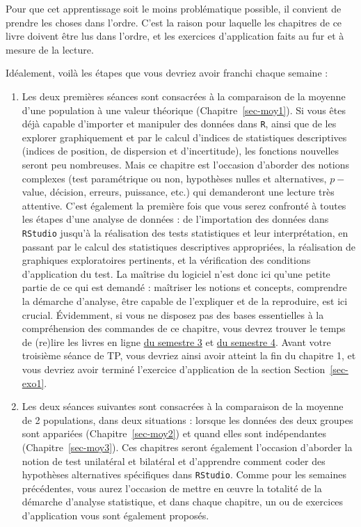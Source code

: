 \documentclass[
  french,
  a4paper,
  DIV=11,
  numbers=noendperiod,
  oneside]{scrreprt}
\begin{document}
Pour que cet apprentissage soit le moins problématique possible, il
convient de prendre les choses dans l'ordre. C'est la raison pour
laquelle les chapitres de ce livre doivent être lus dans l'ordre, et les
exercices d'application faits au fur et à mesure de la lecture.

Idéalement, voilà les étapes que vous devriez avoir franchi chaque
semaine :

\begin{enumerate}
\def\labelenumi{\arabic{enumi}.}
\item
  Les deux premières séances sont consacrées à la comparaison de la
  moyenne d'une population à une valeur théorique
  (Chapitre~\ref{sec-moy1}). Si vous êtes déjà capable d'importer et
  manipuler des données dans \texttt{R}, ainsi que de les explorer
  graphiquement et par le calcul d'indices de statistiques descriptives
  (indices de position, de dispersion et d'incertitude), les fonctions
  nouvelles seront peu nombreuses. Mais ce chapitre est l'occasion
  d'aborder des notions complexes (test paramétrique ou non, hypothèses
  nulles et alternatives, \(p-\)value, décision, erreurs, puissance,
  etc.) qui demanderont une lecture très attentive. C'est également la
  première fois que vous serez confronté à toutes les étapes d'une
  analyse de données : de l'importation des données dans
  \texttt{RStudio} jusqu'à la réalisation des tests statistiques et leur
  interprétation, en passant par le calcul des statistiques descriptives
  appropriées, la réalisation de graphiques exploratoires pertinents, et
  la vérification des conditions d'application du test. La maîtrise du
  logiciel n'est donc ici qu'une petite partie de ce qui est demandé :
  maîtriser les notions et concepts, comprendre la démarche d'analyse,
  être capable de l'expliquer et de la reproduire, est ici crucial.
  Évidemment, si vous ne disposez pas des bases essentielles à la
  compréhension des commandes de ce chapitre, vous devrez trouver le
  temps de (re)lire les livres en ligne
  \href{https://besibo.github.io/BiometrieS3/}{du semestre 3} et
  \href{https://besibo.github.io/BiometrieS4/}{du semestre 4}. Avant
  votre troisième séance de TP, vous devriez ainsi avoir atteint la fin
  du chapitre 1, et vous devriez avoir terminé l'exercice d'application
  de la section Section~\ref{sec-exo1}.
\item
  Les deux séances suivantes sont consacrées à la comparaison de la
  moyenne de 2 populations, dans deux situations : lorsque les données
  des deux groupes sont appariées (Chapitre~\ref{sec-moy2}) et quand
  elles sont indépendantes (Chapitre~\ref{sec-moy3}). Ces chapitres
  seront également l'occasion d'aborder la notion de test unilatéral et
  bilatéral et d'apprendre comment coder des hypothèses alternatives
  spécifiques dans \texttt{RStudio}. Comme pour les semaines
  précédentes, vous aurez l'occasion de mettre en œuvre la totalité de
  la démarche d'analyse statistique, et dans chaque chapitre, un ou de
  exercices d'application vous sont également proposés.
\end{enumerate}
\end{document}
